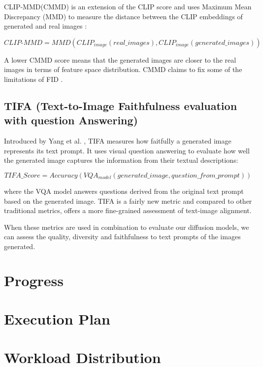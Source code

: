 \documentclass{article}
\begin{document}
CLIP-MMD(CMMD) is an extension of the CLIP score and uses Maximum Mean Discrepancy (MMD) to measure the distance between the 
CLIP embeddings of generated and real images \cite{gao2022measuring}:

\begin{equation}
    CLIP\text{-}MMD = MMD(CLIP_{image}(real\_images), CLIP_{image}(generated\_images))
\end{equation}

A lower CMMD score means that the generated images are closer to the real images in terms of feature space distribution. CMMD claims to 
fix some of the limitations of FID \cite{rethinkingFID2024}.

\subsection{TIFA (Text-to-Image Faithfulness evaluation with question Answering)}

Introduced by Yang et al. \cite{yang2022empirical}, TIFA measures how faitfully a generated image represents its text prompt.
It uses visual question answering to evaluate how well the generated image captures the information from their textual descriptions:

\begin{equation}
    TIFA\_Score = Accuracy(VQA_{model}(generated\_image, question\_from\_prompt))
\end{equation}

where the VQA model answers questions derived from the original text prompt based on the generated image. 
TIFA is a fairly new metric and compared to other traditional metrics, offers a more fine-grained assessment of text-image alignment.

When these metrics are used in combination to evaluate our diffusion models, we can assess the quality, diversity and faithfulness
to text prompts of the images generated.


\section{Progress}


\section{Execution Plan}

\section{Workload Distribution}
\end{document}
